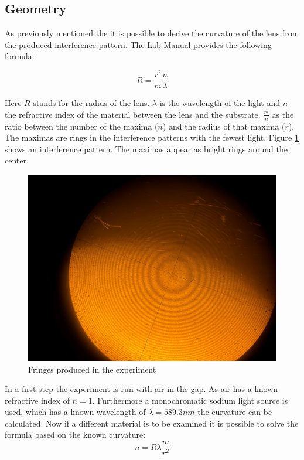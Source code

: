 \documentclass[12pt]{article}
\begin{document}
\subsection{Geometry}

As previously mentioned the it is possible to derive the curvature of the lens from the
produced interference pattern. The Lab Manual\autocite{ross} provides the following formula:

\begin{equation}
  R = \frac{r^2}{m}\frac{n}{\lambda}
  \label{eq:lens_curvature}
\end{equation}

Here $R$ stands for the radius of the lens. $\lambda$ is the wavelength of the light and $n$ the 
refractive index of the material between the lens and the substrate.
$\frac{r^2}{n}$ as the ratio between the number of the maxima
($n$) and the radius of that maxima ($r$). The maximas are rings in the interference patterns with the
fewest light. Figure \ref*{fig:sodium_pattern} shows an interference pattern. The maximas appear as bright
rings around the center. 


\begin{figure}[H]
  \centering
  \includegraphics[width=12cm]{./images/sodium_pattern.jpeg}
  \caption{Fringes produced in the experiment}
  \label{fig:sodium_pattern}
\end{figure}


In a first step the experiment is run with air in the gap. As air has a known refractive index
of $n = 1$. Furthermore a monochromatic sodium light source is used, which has a known wavelength
of $\lambda = 589.3 nm$\autocite{ross} the curvature can be calculated. Now if a different material is to be examined it is
possible to solve the formula based on the known curvature:
\begin{equation}
  n = R \lambda \frac{m}{r^2}
  \label{eq:refractive_index}
\end{equation}
\end{document}
